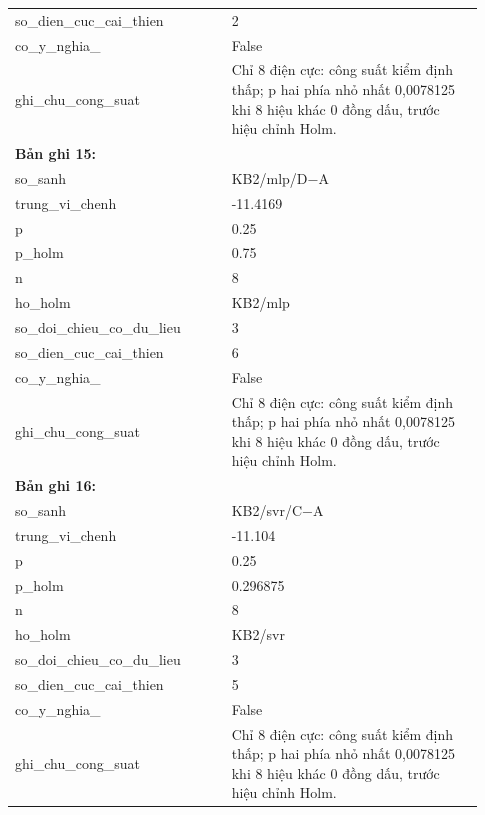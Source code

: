 \begin{longtable}{p{0.43\linewidth}p{0.50\linewidth}}
so\_\allowbreak dien\_\allowbreak cuc\_\allowbreak cai\_\allowbreak thien & 2 \\
co\_\allowbreak y\_\allowbreak nghia\_\allowbreak 005 & False \\
ghi\_\allowbreak chu\_\allowbreak cong\_\allowbreak suat & Chỉ 8 điện cực: công suất kiểm định thấp; p hai phía nhỏ nhất 0,0078125 khi 8 hiệu khác 0 đồng dấu, trước hiệu chỉnh Holm. \\
\midrule
\multicolumn{2}{p{0.95\linewidth}}{\textbf{Bản ghi 15: }} \\
so\_\allowbreak sanh & KB2/mlp/D−A \\
trung\_\allowbreak vi\_\allowbreak chenh & -11.4169 \\
p & 0.25 \\
p\_\allowbreak holm & 0.75 \\
n & 8 \\
ho\_\allowbreak holm & KB2/mlp \\
so\_\allowbreak doi\_\allowbreak chieu\_\allowbreak co\_\allowbreak du\_\allowbreak lieu & 3 \\
so\_\allowbreak dien\_\allowbreak cuc\_\allowbreak cai\_\allowbreak thien & 6 \\
co\_\allowbreak y\_\allowbreak nghia\_\allowbreak 005 & False \\
ghi\_\allowbreak chu\_\allowbreak cong\_\allowbreak suat & Chỉ 8 điện cực: công suất kiểm định thấp; p hai phía nhỏ nhất 0,0078125 khi 8 hiệu khác 0 đồng dấu, trước hiệu chỉnh Holm. \\
\midrule
\multicolumn{2}{p{0.95\linewidth}}{\textbf{Bản ghi 16: }} \\
so\_\allowbreak sanh & KB2/svr/C−A \\
trung\_\allowbreak vi\_\allowbreak chenh & -11.104 \\
p & 0.25 \\
p\_\allowbreak holm & 0.296875 \\
n & 8 \\
ho\_\allowbreak holm & KB2/svr \\
so\_\allowbreak doi\_\allowbreak chieu\_\allowbreak co\_\allowbreak du\_\allowbreak lieu & 3 \\
so\_\allowbreak dien\_\allowbreak cuc\_\allowbreak cai\_\allowbreak thien & 5 \\
co\_\allowbreak y\_\allowbreak nghia\_\allowbreak 005 & False \\
ghi\_\allowbreak chu\_\allowbreak cong\_\allowbreak suat & Chỉ 8 điện cực: công suất kiểm định thấp; p hai phía nhỏ nhất 0,0078125 khi 8 hiệu khác 0 đồng dấu, trước hiệu chỉnh Holm. \\

\end{longtable}
